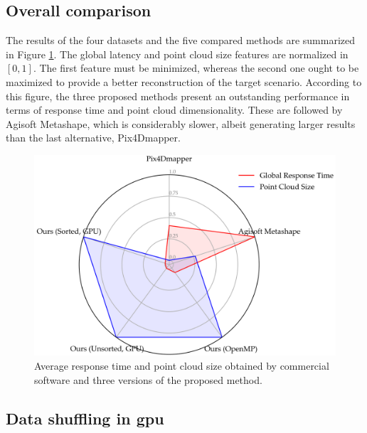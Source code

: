 \subsection{Overall comparison}

The results of the four datasets and the five compared methods are summarized in Figure \ref{fig:occlusion_normalized_features}. The global latency and point cloud size features are normalized in $[0, 1]$. The first feature must be minimized, whereas the second one ought to be maximized to provide a better reconstruction of the target scenario. According to this figure, the three proposed methods present an outstanding performance in terms of response time and point cloud dimensionality. These are followed by Agisoft Metashape, which is considerably slower, albeit generating larger results than the last alternative, Pix4Dmapper.

\begin{figure}[ht]
    \includegraphics[width=.8\linewidth]{figs/multi_thermal_projection/results/normalized_features.png}
    \caption{Average response time and point cloud size obtained by commercial software and three versions of the proposed method.}
    \label{fig:occlusion_normalized_features}
\end{figure}

\subsection{Data shuffling in \acrshort{gpu}}

